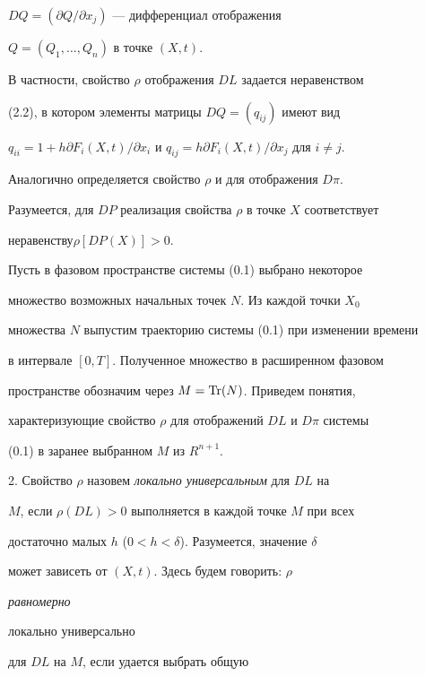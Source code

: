 $D Q=(\partial Q/\partial x_j)$ --- дифференциал отображения


$Q=(Q_1,\dotsc,Q_n)$ в точке $(X,t)$. 


 


В частности, свойство $\rho$ отображения $D L$ задается неравенством 


(2.2), в котором элементы матрицы $D Q=(q_{i j})$ имеют вид 


$q_{i i}=1+h\partial F_i(X,t)/\partial x_i$ и $q_{i j}=h\partial 


F_i(X,t)/\partial x_j$ для $i\ne j$. 


 


Аналогично определяется свойство $\rho$ и для отображения $D\pi$. 


 


Разумеется, для $D P$ реализация свойства $\rho$ в точке $X$ соответствует 


неравенству\linebreak $\rho[D P(X)]>0$. 


 


Пусть в фазовом пространстве системы (0.1) выбрано некоторое 


множество возможных начальных точек $N$. Из каждой точки $X_0$ 


множества $N$ выпустим траекторию системы (0.1) при изменении времени 


в интервале $[0,T]$. Полученное множество в расширенном фазовом 


пространстве обозначим через $M=\operatorname{Tr}(N)$. Приведем понятия, 


характеризующие свойство $\rho$ для отображений $D L$ и $D\pi$ системы 


(0.1) в заранее выбранном $M$ из $R^{n+1}$. 


 


2. Свойство $\rho$ назовем {\it локально универсальным\/} для $D L$ на 


$M$, если $\rho(D L)>0$ выполняется в каждой точке $M$ при всех 


достаточно малых $h$ ($0<h<\delta$). Разумеется, значение $\delta$ 


может зависеть от $(X,t)$. Здесь будем говорить: $\rho$ {\it равномерно 


локально универсально\/} для $D L$ на $M$, если удается выбрать общую 


